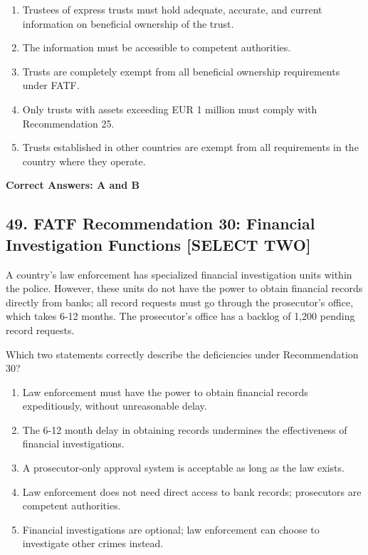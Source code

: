 \documentclass[11pt,a4paper]{article}
\begin{document}
	\begin{enumerate}[label=\Alph*.]
		\item Trustees of express trusts must hold adequate, accurate, and current information on beneficial ownership of the trust.
		\item The information must be accessible to competent authorities.
		\item Trusts are completely exempt from all beneficial ownership requirements under FATF.
		\item Only trusts with assets exceeding EUR 1 million must comply with Recommendation 25.
		\item Trusts established in other countries are exempt from all requirements in the country where they operate.
	\end{enumerate}
	
	\textbf{Correct Answers: A and B}
	
	\subsection{49. FATF Recommendation 30: Financial Investigation Functions \textnormal{[SELECT TWO]}}
	
	A country's law enforcement has specialized financial investigation units within the police. However, these units do not have the power to obtain financial records directly from banks; all record requests must go through the prosecutor's office, which takes 6-12 months. The prosecutor's office has a backlog of 1,200 pending record requests.
	
	Which two statements correctly describe the deficiencies under Recommendation 30?
	
	\begin{enumerate}[label=\Alph*.]
		\item Law enforcement must have the power to obtain financial records expeditiously, without unreasonable delay.
		\item The 6-12 month delay in obtaining records undermines the effectiveness of financial investigations.
		\item A prosecutor-only approval system is acceptable as long as the law exists.
		\item Law enforcement does not need direct access to bank records; prosecutors are competent authorities.
		\item Financial investigations are optional; law enforcement can choose to investigate other crimes instead.
	\end{enumerate}
	
\end{document}
